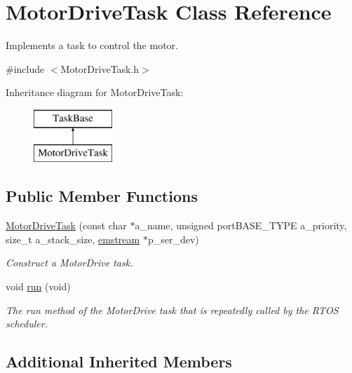 \hypertarget{class_motor_drive_task}{}\section{Motor\+Drive\+Task Class Reference}
\label{class_motor_drive_task}


Implements a task to control the motor.  




{\ttfamily \#include $<$Motor\+Drive\+Task.\+h$>$}

Inheritance diagram for Motor\+Drive\+Task\+:\begin{figure}[H]
\begin{center}
\leavevmode
\includegraphics[height=2.000000cm]{class_motor_drive_task}
\end{center}
\end{figure}
\subsection*{Public Member Functions}
\begin{DoxyCompactItemize}
\item 
\mbox{\hyperlink{class_motor_drive_task_ae97b28489a97e5f365a5d27156153f0e}{Motor\+Drive\+Task}} (const char $\ast$a\+\_\+name, unsigned port\+B\+A\+S\+E\+\_\+\+T\+Y\+PE a\+\_\+priority, size\+\_\+t a\+\_\+stack\+\_\+size, \mbox{\hyperlink{classemstream}{emstream}} $\ast$p\+\_\+ser\+\_\+dev)
\begin{DoxyCompactList}\small\item\em Construct a Motor\+Drive task. \end{DoxyCompactList}\item 
void \mbox{\hyperlink{class_motor_drive_task_abc617fef420f9dc8cdd6144d8d7adea8}{run}} (void)
\begin{DoxyCompactList}\small\item\em The run method of the Motor\+Drive task that is repeatedly called by the R\+T\+OS scheduler. \end{DoxyCompactList}\end{DoxyCompactItemize}
\subsection*{Additional Inherited Members}


